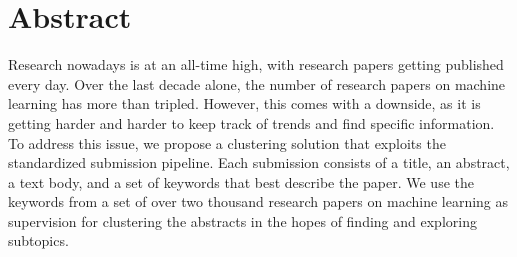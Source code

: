 \section{Abstract}
Research nowadays is at an all-time high, with research papers getting published every day.
Over the last decade alone, the number of research papers on machine learning has more than tripled.\cite{dimensions}
However, this comes with a downside, as it is getting harder and harder to keep track of trends and find specific information.
To address this issue, we propose a clustering solution that exploits the standardized submission pipeline.
Each submission consists of a title, an abstract, a text body, and a set of keywords that best describe the paper.
We use the keywords from a set of over two thousand research papers on machine learning as supervision for clustering the abstracts in the hopes of finding and exploring subtopics.